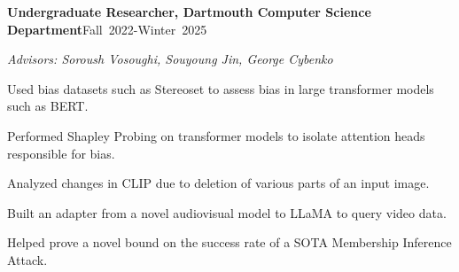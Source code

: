 \documentclass[letterpaper,11pt]{article}
\newcommand{\entrygap}{\par\addvspace{\baselineskip}}
\newcommand{\datedline}[2]{#1\hfill\mbox{#2}\par\nobreak}
\newcommand{\researchrole}[2]{\datedline{\textbf{#1}}{#2}}
\begin{document}
\entrygap
\researchrole{Undergraduate Researcher, Dartmouth Computer Science Department}{Fall 2022-Winter 2025}
\textit{Advisors: Soroush Vosoughi, Souyoung Jin, George Cybenko}\par
Used bias datasets such as Stereoset to assess bias in large transformer models such as BERT.\par
Performed Shapley Probing on transformer models to isolate attention heads responsible for
bias.\par
Analyzed changes in CLIP due to deletion of various parts of an input image.\par
Built an adapter from a novel audiovisual model to LLaMA to query video data.\par
Helped prove a novel bound on the success rate of a SOTA Membership Inference Attack.\par
\end{document}
